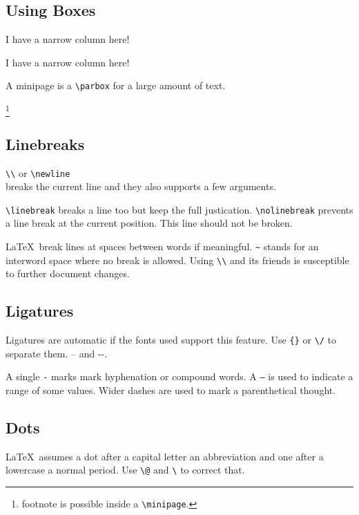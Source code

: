 \documentclass[a4paper,12pt]{article}
\newcommand{\code}[1]{\texttt{#1}}
\begin{document}
\subsection{Using Boxes}

\parbox[t]{1cm}{I have a narrow column here!}
\quad
\parbox[b]{1cm}{I have a narrow column here!}
\quad
\begin{minipage}{3cm}
A minipage is a \code{\textbackslash parbox} for a large amount of text.

\footnote{footnote is possible inside a \code{\textbackslash minipage}.}
\end{minipage}

\subsection{Linebreaks}

\code{\textbackslash\textbackslash} or \code{\textbackslash newline} \\[1cm] breaks the current line and they also supports a few arguments.

\code{\textbackslash linebreak} breaks a line too but keep the full justication. \code{\textbackslash nolinebreak} prevents a line break at the current position. \nolinebreak[4] \linebreak[1]
This line should not be broken.

\LaTeX\ break lines at spaces between words if meaningful. \code{\~} stands for an interword space where no break is allowed. Using \code{\textbackslash\textbackslash} and its friends is susceptible to further document changes.

\subsection{Ligatures}

Ligatures are automatic if the fonts used support this feature. Use \code{\{\}} or \code{\textbackslash/} to separate them. -- and -\/-.

A single \code{-} marks mark hyphenation or compound words. A \code{--} is used to indicate a range of some values. Wider dashes are used to mark a parenthetical thought.

\subsection{Dots}

\LaTeX\ assumes a dot after a capital letter an abbreviation and one after a lowercase a normal period. Use \code{\textbackslash @} and \code{\textbackslash } to correct that.
\end{document}
